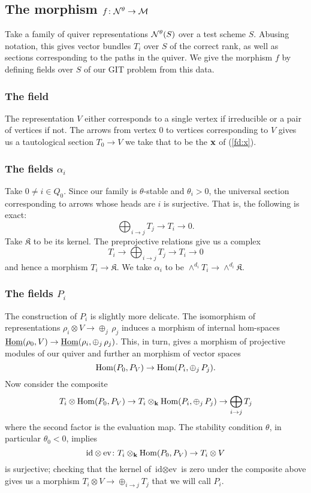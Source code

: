 \documentclass{amsart}
\theoremstyle{definition}
\begin{document}
\subsection{The morphism $f \colon \mathcal{N}^\theta \rightarrow \mathcal{M}$}

Take a family of quiver representations $\mathcal{N}^\theta(S)$ over a test scheme $S$.
Abusing notation, this gives vector bundles $T_i$ over $S$ of the correct rank, as well as sections corresponding to the paths in the quiver.
We give the morphism $f$ by defining fields over $S$ of our GIT problem from this data.

\subsubsection{The field \bfx}

The representation $V$ either corresponds to a single vertex if irreducible or a pair of vertices if not.
The arrows from vertex $0$ to vertices corresponding to $V$ gives us a tautological section $T_0 \rightarrow V$ we take that to be the $\mathbf{x}$ of (\ref{fd:x}).

\subsubsection{The fields $\alpha_i$}

Take $0 \neq i \in Q_0$.
Since our family is $\theta$-stable and $\theta_i>0$, the universal section corresponding to arrows whose heads are $i$ is surjective. 
That is, the following is exact:
$$\bigoplus_{i \rightarrow j} T_j \longrightarrow T_i \longrightarrow 0.$$
Take $\mathfrak{K}$ to be its kernel.
The preprojective relations give us a complex
$$T_i \longrightarrow \bigoplus_{i \rightarrow j} T_j \longrightarrow T_i \longrightarrow 0$$
and hence a morphism $T_i \rightarrow \mathfrak{K}$.
We take $\alpha_i$ to be $\wedge^{d_i} T_i \rightarrow \wedge^{d_i}\mathfrak{K}.$

\subsubsection{The fields $P_i$}

The construction of $P_i$ is slightly more delicate.
The isomorphism of representations $\rho_i \otimes V \rightarrow \oplus_j\, \rho_j$ induces a morphism of internal hom-spaces $\underline{\operatorname{Hom}}(\rho_0, V) \rightarrow \underline{\operatorname{Hom}}(\rho_i, \oplus_j \, \rho_j)$.
This, in turn, gives a morphism of projective modules of our quiver and further an morphism of vector spaces $$\operatorname{Hom}(P_0, P_V) \rightarrow \operatorname{Hom}(P_i, \oplus_j \, P_j).$$
Now consider the composite $$T_i \otimes \operatorname{Hom}(P_0, P_V) \rightarrow T_i \otimes_{\mathbf{k}} \operatorname{Hom}(P_i, \oplus_j \, P_j) \rightarrow \bigoplus_{i \rightarrow j} T_j$$ where the second factor is the evaluation map.
The stability condition $\theta$, in particular $\theta_0<0$, implies $$\text{id} \otimes \text{ev} \colon T_i \otimes_{\mathbf{k}} \operatorname{Hom}(P_0, P_V) \rightarrow T_i \otimes V$$ is surjective; checking that the kernel of $\text{id} \otimes \text{ev}$ is zero under the composite above gives us a morphism $T_i \otimes V \rightarrow \oplus_{i \rightarrow j} T_j$ that we will call $P_i$.
\end{document}
